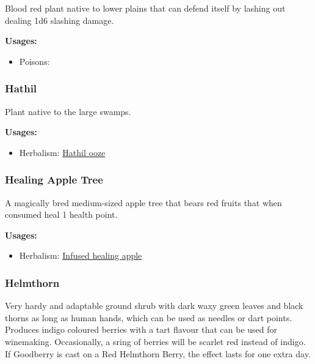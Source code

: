 Blood red plant native to lower plains that can defend itself by lashing out dealing 1d6 slashing damage.

\vspace{5mm}

\textbf{Usages:}

\begin{itemize}[noitemsep]
\item[] Poisons: \poison
\end{itemize}

\subsubsection{Hathil}
\label{Hathil}

Plant native to the large swamps.

\vspace{5mm}

\textbf{Usages:}

\begin{itemize}[noitemsep]
\item[] Herbalism: \hyperref[Hathil ooze]{Hathil ooze}
\end{itemize}

\subsubsection{Healing Apple Tree}
\label{Healing Apple Tree}

A magically bred medium-sized apple tree that bears red fruits that when consumed heal 1 health point.

\vspace{5mm}

\textbf{Usages:}

\begin{itemize}[noitemsep]
\item[] Herbalism: \hyperref[Infused healing apple]{Infused healing apple}
\end{itemize}

\subsubsection{Helmthorn}
\label{Helmthorn}

Very hardy and adaptable ground shrub with dark waxy green leaves and black thorns as long as human hands, which can be used as needles or dart points. Produces indigo coloured berries with a tart flavour that can be used for winemaking. Occasionally, a sring of berries will be scarlet red instead of indigo. If Goodberry is cast on a Red Helmthorn Berry, the effect lasts for one extra day.

